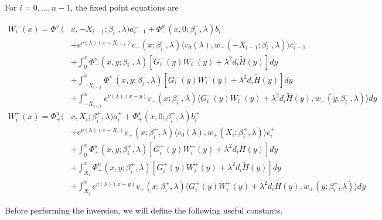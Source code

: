 \documentclass[12pt]{article}
\begin{document}
For $i = 0, \dots, n-1$, the fixed point equations are

\begin{align*}
W_i^-(x) = \Phi^s_-(&x, -X_{i-1}; \beta_i^-, \lambda) a_{i-1}^- + \Phi^u_-(x, 0; \beta_i^-, \lambda) b_i^- \\
&+ e^{\nu(\lambda)(x+X_{i-1})} v_-(x; \beta_i^-, \lambda) \langle v_0(\lambda), w_-(-X_{i-1}; \beta_i^-, \lambda) \rangle c_{i-1}^- \\
&+ \int_0^x \Phi^u_-(x, y; \beta_i^-, \lambda)[ G_i^-(y)W_i^-(y) + \lambda^2 d_i \tilde{H}(y) ] dy \\
&+ \int_{-X_{i-1}}^x \Phi^s_-(x, y; \beta_i^-, \lambda) [ G_i^-(y)W_i^-(y) + \lambda^2 d_i \tilde{H}(y) ] dy \\
&+ \int_{-X_{i-1}}^x 
e^{\nu(\lambda)(x-y)} v_-(x; \beta_i^-, \lambda) \langle G_i^-(y)W_i^-(y) + \lambda^2 d_i \tilde{H}(y), w_-(y; \beta_i^-, \lambda) \rangle dy \\
W_i^+(x) = \Phi^u_+(&x, X_i; \beta_i^+, \lambda)a_i^+ + \Phi^s_+(x, 0; \beta_i^+, \lambda)b_i^+ \\
&+ e^{\nu(\lambda)(x - X_i)} v_+(x; \beta_i^+, \lambda) \langle v_0(\lambda), w_+(X_i; \beta_i^+, \lambda) \rangle c_i^+ \\
&+ \int_0^x \Phi^s_+(x, y; \beta_i^+, \lambda) [ G_i^+(y)W_i^+(y) + \lambda^2 d_i \tilde{H}(y) ] dy \\
&+ \int_{X_i}^x \Phi^u_+(x, y; \beta_i^+, \lambda) [ G_i^+(y)W_i^+(y) + \lambda^2 d_i \tilde{H}(y) ] dy \\
&+ \int_{X_i}^x e^{\nu(\lambda)(x-y)} v_+(x; \beta_i^+, \lambda) \langle G_i^+(y)W_i^+(y) + \lambda^2 d_i \tilde{H}(y), w_+(y; \beta_i^+, \lambda) \rangle dy
\end{align*}

Before performing the inversion, we will define the following useful constants.
\end{document}

